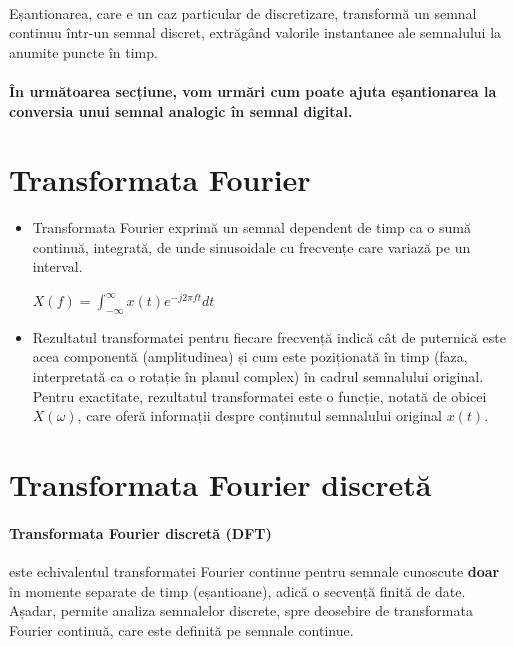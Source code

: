 \documentclass{article}
\begin{document}
\paragraph{}Eșantionarea, care e un caz particular de discretizare, transformă un semnal continuu într-un semnal discret, extrăgând valorile instantanee ale semnalului la anumite puncte în timp.

\paragraph{În următoarea secțiune, vom urmări cum poate ajuta eșantionarea la conversia unui semnal analogic în semnal digital.}

\section*{Transformata Fourier}
\begin{itemize}
    \item Transformata Fourier exprimă un semnal dependent de timp ca o sumă continuă, integrată, de unde sinusoidale cu frecvențe care variază pe un interval.
    
    \(X(f) = \int_{-\infty}^{\infty} x(t) e^{-j 2 \pi f t} dt\)
    
    \item Rezultatul transformatei pentru fiecare frecvență indică cât de puternică este acea componentă (amplitudinea) și cum este poziționată în timp (faza, interpretată ca o rotație în planul complex) în cadrul semnalului original. Pentru exactitate, rezultatul transformatei este o funcție, notată de obicei \(X(\omega)\), care oferă informații despre conținutul semnalului original \(x(t)\).
\end{itemize}

\section*{Transformata Fourier discretă}
\paragraph{Transformata Fourier discretă (DFT)} este echivalentul transformatei Fourier continue pentru semnale cunoscute \textbf{doar} în momente separate de timp (eșantioane), adică o secvență finită de date. Așadar, permite analiza semnalelor discrete, spre deosebire de transformata Fourier continuă, care este definită pe semnale continue.
\end{document}
